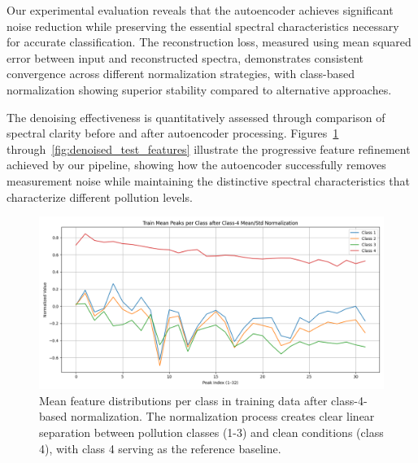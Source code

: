 Our experimental evaluation reveals that the autoencoder achieves significant noise reduction while preserving the essential spectral characteristics necessary for accurate classification. The reconstruction loss, measured using mean squared error between input and reconstructed spectra, demonstrates consistent convergence across different normalization strategies, with class-based normalization showing superior stability compared to alternative approaches.

The denoising effectiveness is quantitatively assessed through comparison of spectral clarity before and after autoencoder processing. Figures~\ref{fig:normalized_train_features} through~\ref{fig:denoised_test_features} illustrate the progressive feature refinement achieved by our pipeline, showing how the autoencoder successfully removes measurement noise while maintaining the distinctive spectral characteristics that characterize different pollution levels.

\begin{figure}[H]
\centering
\includegraphics[width=\textwidth]{out/class_based_mean_std_normalized/class_based_mean_std_normalized_train_mean_feature_per_class.png}
\caption{Mean feature distributions per class in training data after class-4-based normalization. The normalization process creates clear linear separation between pollution classes (1-3) and clean conditions (class 4), with class 4 serving as the reference baseline.}
\label{fig:normalized_train_features}
\end{figure}

